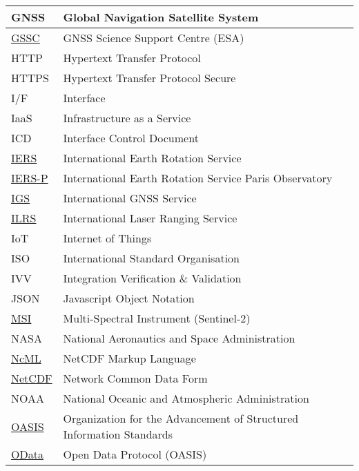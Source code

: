 \documentclass[dec_sum_main.tex]{subfiles}
\begin{document}
\begin{longtable}{|m{2.8cm}|m{10cm}|}
	GNSS & Global Navigation Satellite System \\ \hline
	\href{https://gssc.esa.int/#about-us}{GSSC} & GNSS Science Support Centre (ESA) \\ \hline
	HTTP & Hypertext Transfer Protocol \\ \hline
	HTTPS & Hypertext Transfer Protocol Secure\\ \hline
	I/F & Interface \\ \hline
	IaaS & Infrastructure as a Service \\ \hline
	ICD & Interface Control Document \\ \hline
	\href{https://www.iers.org/IERS/EN/Publications/Bulletins/bulletins.html}{IERS} & International Earth Rotation Service \\ \hline
	\href{https://hpiers.obspm.fr/}{IERS-P} & International Earth Rotation Service Paris Observatory\\ \hline
	\href{https://igs.org/about/#products}{IGS} & International GNSS Service \\ \hline
	\href{https://ilrs.gsfc.nasa.gov/data_and_products/data_centers/index.html}{ILRS} & International Laser Ranging Service \\ \hline
	IoT & Internet of Things \\ \hline
	ISO & International Standard Organisation \\ \hline
    IVV & Integration Verification \& Validation \\ \hline
	JSON & Javascript Object Notation \\ \hline
	\href{https://sentinels.copernicus.eu/web/sentinel/technical-guides/sentinel-2-msi/msi-instrument}{MSI} & Multi-Spectral Instrument (Sentinel-2) \\ \hline
	NASA & National Aeronautics and Space Administration \\ \hline
    \href{https://www.unidata.ucar.edu/software/netcdf-java/v4.6/ncml/index.htm}{NcML} & NetCDF Markup Language \\ \hline
    \href{https://www.unidata.ucar.edu/software/netcdf/}{NetCDF} & Network Common Data Form \\ \hline
	NOAA & National Oceanic and Atmospheric Administration \\ \hline
	\href{https://www.oasis-open.org/}{OASIS} & Organization for the Advancement of Structured Information Standards \\ \hline
	\href{https://www.odata.org/documentation/}{OData} & Open Data Protocol (OASIS) \\ \hline

\end{longtable}
\end{document}

